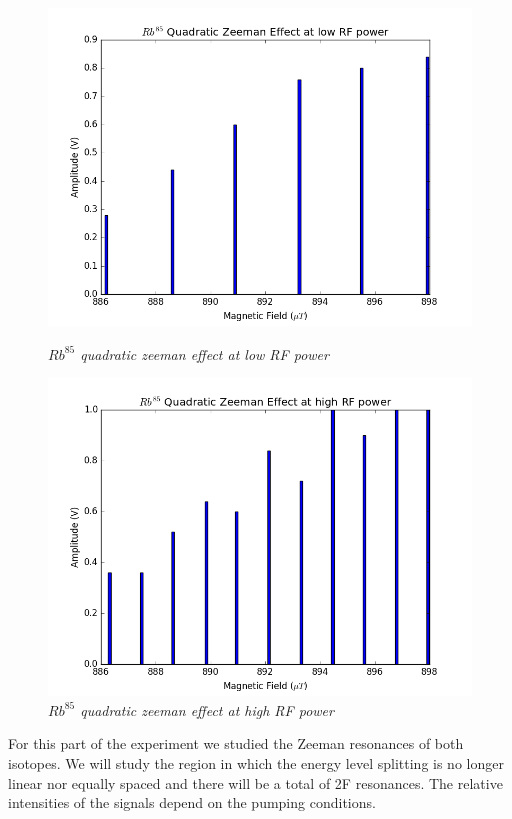 \documentclass[twocolumn]{article}
\begin{document}
\begin{figure}
\begin{minipage}[t]{0.45\linewidth}
\label{fig:25}
\end{minipage}
\vfill
\begin{minipage}[t]{0.45\linewidth}
\includegraphics[width=\linewidth]{pictures/rb85-low.png}
\caption{\textit{$Rb^{85}$ quadratic zeeman effect at low RF power}}
\label{fig:26}
\end{minipage}
\hfill
\begin{minipage}[t]{0.45\linewidth}
\includegraphics[width=\linewidth]{pictures/rb85-high.png}
\caption{\textit{$Rb^{85}$ quadratic zeeman effect at high RF power}}
\label{fig:27}
\end{minipage}
\end{figure}
For this part of the experiment we studied the Zeeman resonances of both 
isotopes. We will study the region in which the energy level splitting is no 
longer linear nor equally spaced and there will be a total of 2F resonances. 
The relative intensities of the signals depend on the pumping conditions.
\end{document}
